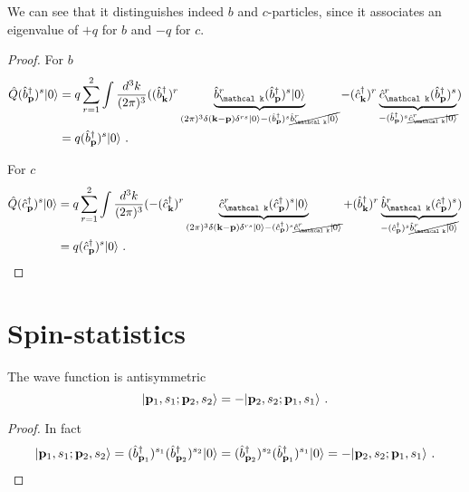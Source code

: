     We can see that it distinguishes indeed $b$ and $c$-particles, since it associates an eigenvalue of $+q$ for $b$ and $-q$ for $c$.
    \begin{proof}
        For $b$
        \begin{equation*}
        \begin{aligned}
            \hat Q (\hat b^\dagger_{\mathbf p})^s \ket{0} & = q \sum_{r=1}^2 \int \frac{d^3 k}{(2\pi)^3} ((\hat b_{\mathbf k}^\dagger)^r \underbrace{\hat b_{\mathcal k}^r (\hat b^\dagger_{\mathbf p})^s \ket{0}}_{(2\pi)^3 \delta(\mathbf k - \mathbf p) \delta^{rs} \ket{0} - (\hat b^\dagger_{\mathbf p})^s \cancel{\hat b_{\mathcal k}^r \ket{0}}} - (\hat c_{\mathbf k}^\dagger)^r \underbrace{\hat c_{\mathcal k}^r (\hat b^\dagger_{\mathbf p})^s}_{- (\hat b^\dagger_{\mathbf p})^s \cancel{\hat c_{\mathcal k}^r \ket{0}}}  ) \\ &  = q (\hat b^\dagger_{\mathbf p})^s \ket{0} ~.
        \end{aligned}
        \end{equation*}

        For $c$
        \begin{equation*}
        \begin{aligned}
            \hat Q (\hat c^\dagger_{\mathbf p})^s \ket{0} & = q \sum_{r=1}^2 \int \frac{d^3 k}{(2\pi)^3} (- (\hat c_{\mathbf k}^\dagger)^r \underbrace{\hat c_{\mathcal k}^r (\hat c^\dagger_{\mathbf p})^s \ket{0}}_{(2\pi)^3 \delta(\mathbf k - \mathbf p) \delta^{rs} \ket{0} - (\hat c^\dagger_{\mathbf p})^s \cancel{\hat c_{\mathcal k}^r \ket{0}}} + (\hat b_{\mathbf k}^\dagger)^r \underbrace{\hat b_{\mathcal k}^r (\hat c^\dagger_{\mathbf p})^s}_{- (\hat c^\dagger_{\mathbf p})^s \cancel{\hat b_{\mathcal k}^r \ket{0}}}  ) \\ &  = q (\hat c^\dagger_{\mathbf p})^s \ket{0} ~.
        \end{aligned}
        \end{equation*}
    \end{proof}

\section{Spin-statistics}

    The wave function is antisymmetric 
    \begin{equation*}
        \vert\mathbf p_1, s_1; \mathbf p_2, s_2\rangle = - \vert\mathbf p_2, s_2; \mathbf p_1, s_1\rangle ~.
    \end{equation*}
    \begin{proof}
        In fact 
        \begin{equation*}
            \vert\mathbf p_1, s_1; \mathbf p_2, s_2\rangle = (\hat b^\dagger_{\mathbf p_1})^{s_1} (\hat b^\dagger_{\mathbf p_2})^{s_2} \vert0\rangle = (\hat b^\dagger_{\mathbf p_2})^{s_2} (\hat b^\dagger_{\mathbf p_1})^{s_1} \vert0\rangle = - \vert\mathbf p_2, s_2; \mathbf p_1, s_1\rangle ~.
        \end{equation*}
    \end{proof}

